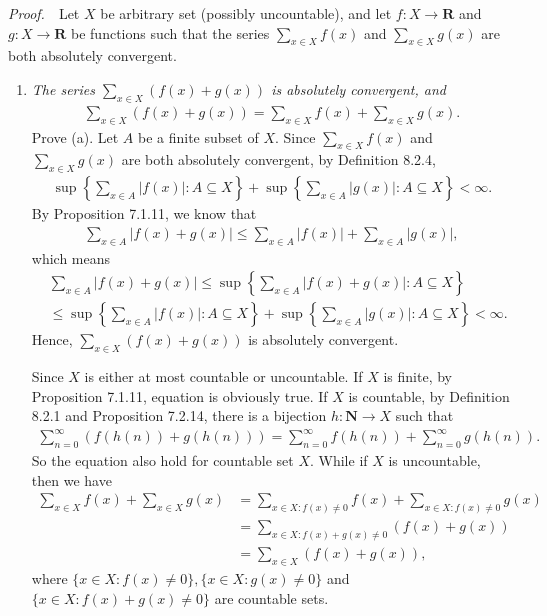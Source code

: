 \documentclass{book}
\newcommand{\pff}{\vspace{.25em}\noindent\emph{Proof.}~~}
\begin{document}
\pff Let $X$ be arbitrary set (possibly uncountable), and let $f:X\to\mathbf{R}$ and $g:X\to\mathbf{R}$ be functions such that the series $\sum_{x\in X}f(x)$ and $\sum_{x\in X}g(x)$ are both absolutely convergent.
\begin{enumerate}
    \item \emph{The series $\sum_{x\in X}(f(x)+g(x))$ is absolutely convergent, and}
        \begin{align*}
            \sum_{x\in X}(f(x)+g(x))=\sum_{x\in X}f(x)+\sum_{x\in X}g(x).
        \end{align*}
    Prove (a). Let $A$ be a finite subset of $X$. Since $\sum_{x\in X}f(x)$ and $\sum_{x\in X}g(x)$ are both absolutely convergent, by Definition 8.2.4,
        \begin{align*}
            \sup\left\{\sum_{x\in A}|f(x)|:A\subseteq X\right\}+\sup\left\{\sum_{x\in A}|g(x)|:A\subseteq X\right\}<\infty.
        \end{align*}
    By Proposition 7.1.11, we know that
        \begin{align*}
            \sum_{x\in A}|f(x)+g(x)|\leq\sum_{x\in A}|f(x)|+\sum_{x\in A}|g(x)|,
        \end{align*}
    which means
        \begin{align*}
            &\sum_{x\in A}|f(x)+g(x)|\leq\sup\left\{\sum_{x\in A}|f(x)+g(x)|:A\subseteq X\right\}\\
            &\leq\sup\left\{\sum_{x\in A}|f(x)|:A\subseteq X\right\}+\sup\left\{\sum_{x\in A}|g(x)|:A\subseteq X\right\}<\infty.
        \end{align*}
    Hence, $\sum_{x\in X}(f(x)+g(x))$ is absolutely convergent.
    
    Since $X$ is either at most countable or uncountable. If $X$ is finite, by Proposition 7.1.11, equation is obviously true. If $X$ is countable, by Definition 8.2.1 and Proposition 7.2.14, there is a bijection $h:\mathbf{N}\to X$ such that
        \begin{align*}
            \sum_{n=0}^{\infty}(f(h(n))+g(h(n)))=\sum_{n=0}^{\infty}f(h(n))+\sum_{n=0}^{\infty}g(h(n)).
        \end{align*}
    So the equation also hold for countable set $X$. While if $X$ is uncountable, then we have
        \begin{align*}
            \sum_{x\in X}f(x)+\sum_{x\in X}g(x)
            &=\sum_{x\in X:f(x)\neq 0}f(x)+\sum_{x\in X:f(x)\neq 0}g(x)\\
            &=\sum_{x\in X:f(x)+g(x)\neq 0}(f(x)+g(x))\\
            &=\sum_{x\in X}(f(x)+g(x)),
        \end{align*}
    where $\{x\in X:f(x)\neq 0\},\{x\in X:g(x)\neq 0\}$ and $\{x\in X:f(x)+g(x)\neq 0\}$ are countable sets.


\end{enumerate}
\end{document}
